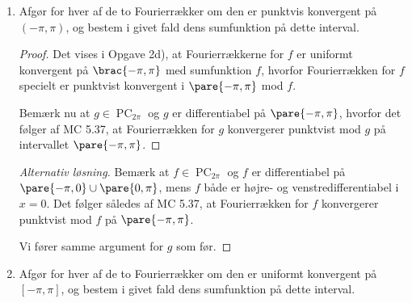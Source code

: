 \begin{opg}
\begin{enumerate}
\item Afgør for hver af de to Fourierrækker om den er punktvis konvergent på
$(-\pi,\pi)$, og bestem i givet fald dens sumfunktion på dette interval.

\begin{proof}
Det vises i Opgave 2d), at Fourierrækkerne for $f$ er uniformt konvergent på $\brac{-\pi,\pi}$ med sumfunktion $f$, hvorfor Fourierrækken for $f$ specielt er punktvist konvergent i $\pare{-\pi,\pi}$ mod $f$.

Bemærk nu at $g\in\operatorname{PC}_{2\pi}$ og $g$ er differentiabel på $\pare{-\pi,\pi}$, hvorfor det følger af MC 5.37, at Fourierrækken for $g$ konvergerer punktvist mod $g$ på intervallet $\pare{-\pi,\pi}$.
\end{proof}

\begin{proof}[Alternativ løsning]
Bemærk at $f\in\operatorname{PC}_{2\pi}$ og $f$ er differentiabel på $\pare{-\pi,0}\cup\pare{0,\pi}$, mens $f$ både er højre- og venstredifferentiabel i $x=0$. Det følger således af MC 5.37, at Fourierrækken for $f$ konvergerer punktvist mod $f$ på $\pare{-\pi,\pi}$.

Vi fører samme argument for $g$ som før.
\end{proof}

\item Afgør for hver af de to Fourierrækker om den er uniformt konvergent på
$[-\pi,\pi]$, og bestem i givet fald dens sumfunktion på dette interval.


\end{enumerate}
\end{opg}
